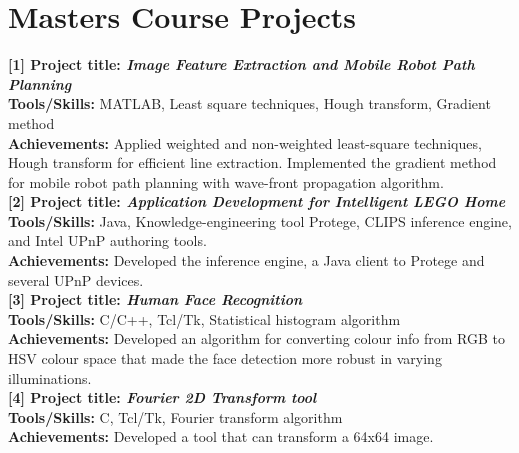 \documentclass[notopicbreak,contbibnum,plain]{simplecv}
\begin{document}
\section{Masters Course Projects}
\vspace*{-0.3cm}
\textbf{[1] Project title: \textit{Image Feature Extraction and Mobile Robot Path Planning}}\\
\textbf{Tools/Skills:} MATLAB, Least square techniques, Hough transform, Gradient method\\
\textbf{Achievements:} Applied weighted and non-weighted least-square techniques, Hough transform for efficient line extraction. Implemented the gradient method for mobile robot path planning with wave-front propagation algorithm.\\
\textbf{[2] Project title: \textit{Application Development for Intelligent LEGO Home}}\\
\textbf{Tools/Skills:} Java, Knowledge-engineering tool Protege, CLIPS inference engine, and Intel UPnP authoring tools.\\
\textbf{Achievements:} Developed the inference engine, a Java client to Protege and several UPnP devices.\\
\textbf{[3] Project title: \textit{Human Face Recognition}}\\
\textbf{Tools/Skills:} C/C++, Tcl/Tk, Statistical histogram algorithm\\
\textbf{Achievements:} Developed an algorithm for converting colour info from RGB to HSV colour space that made the face detection more robust in varying illuminations.\\
\textbf{[4] Project title: \textit{Fourier 2D Transform tool}}\\
\textbf{Tools/Skills:} C, Tcl/Tk, Fourier transform algorithm\\
\textbf{Achievements:} Developed a tool that can transform a 64x64 image.
\end{document}
